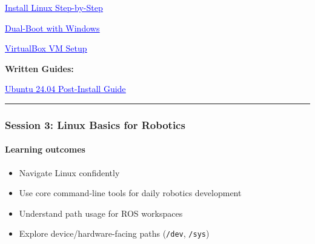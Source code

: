 \documentclass[
  english,
  paper=a4,
  oneside  ,captions=tableheading
]{scrartcl}
\providecommand{\tightlist}{%
  \setlength{\itemsep}{0pt}\setlength{\parskip}{0pt}}
\begin{document}
%
  \par\vspace{0.5ex}%
  \href{https://www.youtube.com/watch?v=C-a5IamFIuM}{\textcolor{blue}{\underline{\faLink\quad Install Linux Step-by-Step}}}%
  \par\vspace{0.5ex}%

%
  \par\vspace{0.5ex}%
  \href{https://youtu.be/XevGfO\_vQJQ?si=OBqaM8UlUeH1wjdQ}{\textcolor{blue}{\underline{\faLink\quad Dual-Boot with Windows}}}%
  \par\vspace{0.5ex}%

%
  \par\vspace{0.5ex}%
  \href{https://youtu.be/wX75Z-4MEoM?si=raCzHOzYJy-GZi9S}{\textcolor{blue}{\underline{\faLink\quad VirtualBox VM Setup}}}%
  \par\vspace{0.5ex}%

\textbf{Written Guides:}

%
  \par\vspace{0.5ex}%
  \href{https://mmbesar.github.io/Tutorials/Ubuntu-24.04-Post/}{\textcolor{blue}{\underline{\faLink\quad Ubuntu 24.04 Post-Install Guide}}}%
  \par\vspace{0.5ex}%

\begin{center}\rule{0.5\linewidth}{0.5pt}\end{center}

\subsubsection{Session 3: Linux Basics for
Robotics}\label{session-3-linux-basics-for-robotics}

\paragraph{Learning outcomes}\label{learning-outcomes-2}

\begin{itemize}
\tightlist
\item
  Navigate Linux confidently
\item
  Use core command-line tools for daily robotics development
\item
  Understand path usage for ROS workspaces
\item
  Explore device/hardware-facing paths (\texttt{/dev}, \texttt{/sys})
\end{itemize}
\end{document}
